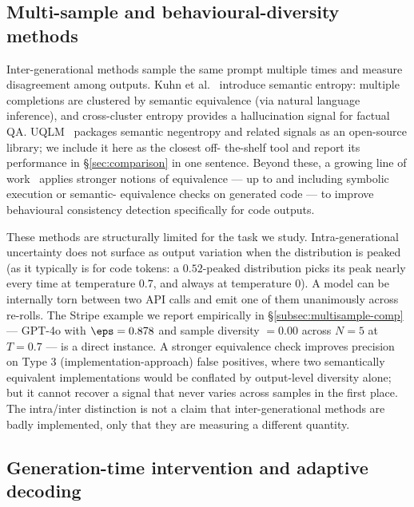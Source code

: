 \subsection{Multi-sample and behavioural-diversity methods}
\label{subsec:related-multisample}

Inter-generational methods sample the same prompt multiple times and
measure disagreement among outputs. Kuhn et
al.~\cite{kuhn2023semantic} introduce semantic entropy: multiple
completions are clustered by semantic equivalence (via natural
language inference), and cross-cluster entropy provides a
hallucination signal for factual QA.
UQLM~\cite{uqlm2024} packages semantic negentropy and related signals
as an open-source library; we include it here as the closest off-%
the-shelf tool and report its performance in \S\ref{sec:comparison}
in one sentence. Beyond these, a growing line of
work~\cite{sharma2025multisample} applies stronger notions of
equivalence --- up to and including symbolic execution or semantic-%
equivalence checks on generated code --- to improve behavioural
consistency detection specifically for code outputs.

These methods are structurally limited for the task we study.
Intra-generational uncertainty does not surface as output variation
when the distribution is peaked (as it typically is for code tokens:
a $0.52$-peaked distribution picks its peak nearly every time at
temperature $0.7$, and always at temperature $0$). A model can be
internally torn between two API calls and emit one of them unanimously
across re-rolls. The Stripe example we report empirically in
\S\ref{subsec:multisample-comp} --- GPT-4o with $\eps=0.878$ and
sample diversity $=0.00$ across $N=5$ at $T=0.7$ --- is a direct
instance. A stronger equivalence check improves precision on Type 3
(implementation-approach) false positives, where two semantically
equivalent implementations would be conflated by output-level
diversity alone; but it cannot recover a signal that never varies
across samples in the first place. The intra/inter distinction is
not a claim that inter-generational methods are badly implemented,
only that they are measuring a different quantity.

\subsection{Generation-time intervention and adaptive decoding}
\label{subsec:related-adadec}

